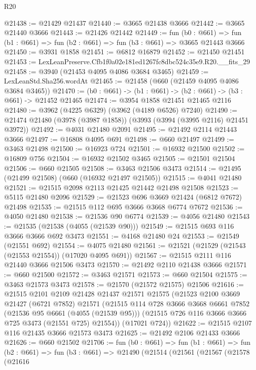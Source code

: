 \begin{lexlean}{R20}
\begin{coremodule}
@21438 := @21429 @21437
@21440 := @3665 @21438 @3666
@21442 := @3665 @21440 @3666
@21443 := @21426 @21442
@21449 := fun (b0 : @661) =>
  fun (b1 : @661) => fun (b2 : @661) => fun (b3 : @661) => @3665 @21443 @3666
@21450 := @3931 @1858
@21451 := @6812 @16879
@21452 := @21450 @21451
@21453 := LexLeanPreserve.Cfb1f0a02e181ed1267fc8dbc524c35e9.R20.__fits_29
@21458 := @3940 (@21453 @4095 @4086 @3684 @3465)
@21459 := LexLeanStd.Sha256.wordAt
@21465 := @21458 (@660 (@21459 @4095 @4086 @3684 @3465))
@21470 := (b0 : @661) -> (b1 : @661) -> (b2 : @661) -> (b3 : @661) -> @21452 @21465
@21474 := @3954 @1858 @21451 @21465 @2116
@21480 := @3962 (@4225 @6329) (@3962 (@4189 @6526) @7240)
@21490 := @21474 @21480 (@3978 (@3987 @1858)) (@3993 (@3994 (@3995 @2116) @21451 @3972))
@21492 := @4031 @21480 @2091
@21495 := @21492 @2114 @21443 @3666
@21497 := @16808 @4095 @691
@21498 := @660 @21497
@21499 := @3463 @21498
@21500 := @16923 @724
@21501 := @16932 @21500
@21502 := @16809 @756
@21504 := @16932 @21502 @3465
@21505 := @21501 @21504
@21506 := @660 @21505
@21508 := @3463 @21506 @3473
@21514 := @21495 (@21499 @21508) (@660 (@16932 @21497 @21505))
@21515 := @4041 @21480
@21521 := @21515 @2098 @2113 @21425 @21442 @21498 @21508
@21523 := @5115 @21480 @2096
@21529 := @21523 @696 @3669 @21424 (@6812 @7672) @21498
@21535 := @21515 @112 @695 @3666 @3668 @6774 @7672
@21536 := @4050 @21480
@21538 := @21536 @90 @6774
@21539 := @4056 @21480
@21543 := @21535 (@21538 (@4055 (@21539 @90)))
@21549 := @21515 @693 @116 @3666 @3666 @692 @3473
@21551 := @4168 @21480 @24
@21553 := @21549 (@21551 @692)
@21554 := @4075 @21480
@21561 := @21521 (@21529 (@21543 (@21553 @21554)) (@17020 @4095 @691))
@21567 := @21515 @2111 @116 @21440 @3666 @21506 @3473
@21570 := @21492 @2110 @21438 @3666
@21571 := @660 @21500
@21572 := @3463 @21571
@21573 := @660 @21504
@21575 := @3463 @21573 @3473
@21578 := @21570 (@21572 @21575) @21506
@21616 := @21515
    @2101
    @2109
    @21428
    @21437
    @21571
    @21575
    (@21523
      @2100
      @3669
      @21427
      (@6721 @7852)
      @21571
      (@21515
        @114
        @728
        @3666
        @3668
        @6661
        @7852
        (@21536 @95 @6661 (@4055 (@21539 @95)))
        (@21515 @726 @116 @3666 @3666 @725 @3473 (@21551 @725) @21554))
      (@17021 @724))
@21622 := @21515 @2107 @116 @21435 @3666 @21573 @3473
@21625 := @21492 @2106 @21433 @3666
@21626 := @660 @21502
@21706 := fun (b0 : @661) =>
  fun (b1 : @661) =>
  fun (b2 : @661) =>
  fun (b3 : @661) =>
  @21490
    (@21514
      (@21561
        (@21567
          (@21578
            (@21616

\end{coremodule}
\end{lexlean}
